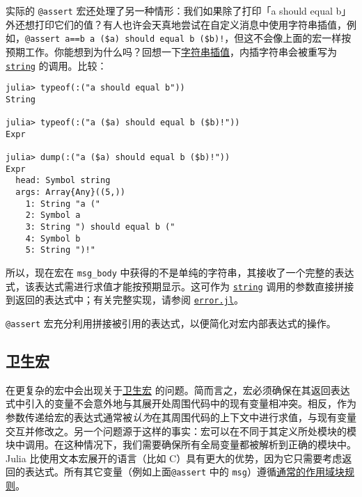 实际的 \texttt{@assert} 宏还处理了另一种情形：我们如果除了打印「a should equal b」外还想打印它们的值？有人也许会天真地尝试在自定义消息中使用字符串插值，例如，\texttt{@assert a==b {\textquotedbl}a (\$a) should equal b (\$b)!{\textquotedbl}}，但这不会像上面的宏一样按预期工作。你能想到为什么吗？回想一下\hyperlink{4452850363638134205}{字符串插值}，内插字符串会被重写为 \hyperlink{7919678712989769360}{\texttt{string}} 的调用。比较：




\begin{verbatim}
julia> typeof(:("a should equal b"))
String

julia> typeof(:("a ($a) should equal b ($b)!"))
Expr

julia> dump(:("a ($a) should equal b ($b)!"))
Expr
  head: Symbol string
  args: Array{Any}((5,))
    1: String "a ("
    2: Symbol a
    3: String ") should equal b ("
    4: Symbol b
    5: String ")!"
\end{verbatim}



所以，现在宏在 \texttt{msg\_body} 中获得的不是单纯的字符串，其接收了一个完整的表达式，该表达式需进行求值才能按预期显示。这可作为 \hyperlink{7919678712989769360}{\texttt{string}} 调用的参数直接拼接到返回的表达式中；有关完整实现，请参阅 \href{https://github.com/JuliaLang/julia/blob/master/base/error.jl}{\texttt{error.jl}}。



\texttt{@assert} 宏充分利用拼接被引用的表达式，以便简化对宏内部表达式的操作。



\hypertarget{12123968542051578223}{}


\subsection{卫生宏}



在更复杂的宏中会出现关于\href{https://en.wikipedia.org/wiki/Hygienic\_macro}{卫生宏} 的问题。简而言之，宏必须确保在其返回表达式中引入的变量不会意外地与其展开处周围代码中的现有变量相冲突。相反，作为参数传递给宏的表达式通常被\emph{认为}在其周围代码的上下文中进行求值，与现有变量交互并修改之。另一个问题源于这样的事实：宏可以在不同于其定义所处模块的模块中调用。在这种情况下，我们需要确保所有全局变量都被解析到正确的模块中。Julia 比使用文本宏展开的语言（比如 C）具有更大的优势，因为它只需要考虑返回的表达式。所有其它变量（例如上面\texttt{@assert} 中的 \texttt{msg}）遵循\hyperlink{11957539949537805757}{通常的作用域块规则}。



